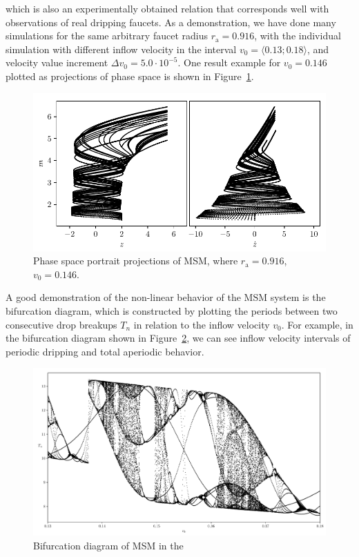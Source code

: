    which is also an experimentally obtained relation that corresponds well with observations of real dripping faucets. As a demonstration, we have done many simulations for the same arbitrary faucet radius $r_{\mathrm{a}} = 0.916$, with the individual simulation with different inflow velocity in the interval $v_0 = \langle 0.13; 0.18 \rangle$, and velocity value increment $\Delta v_0 = 5.0 \cdot 10^{-5}$. One result example for $v_0 = 0.146$ plotted as projections of phase space is shown in Figure~\ref{fig:plot_msm_state_space}. 

    \begin{figure}[H]
    \begin{center}
        \includegraphics[width=1.0\columnwidth]{img/plot_msm_state_space.pdf}
    \end{center}
        \caption{Phase space portrait projections of MSM, where \mbox{$r_{\mathrm{a}} = 0.916$}, $v_0 = 0.146$.}
    \label{fig:plot_msm_state_space}
    \end{figure}

    A good demonstration of the non-linear behavior of the MSM system is the bifurcation diagram, which is constructed by plotting the periods between two consecutive drop breakups $T_n$ in relation to the inflow velocity $v_0$. For example, in the bifurcation diagram shown in Figure~\ref{fig:plot_msm_bifurcation}, we can see inflow velocity intervals of periodic dripping and total aperiodic behavior. 

    \begin{figure}
        \includegraphics[width=1.0\columnwidth]{img/plot_msm_bifurcation.pdf}
        \caption{Bifurcation diagram of MSM in the }
        \label{fig:plot_msm_bifurcation}
    \end{figure}

